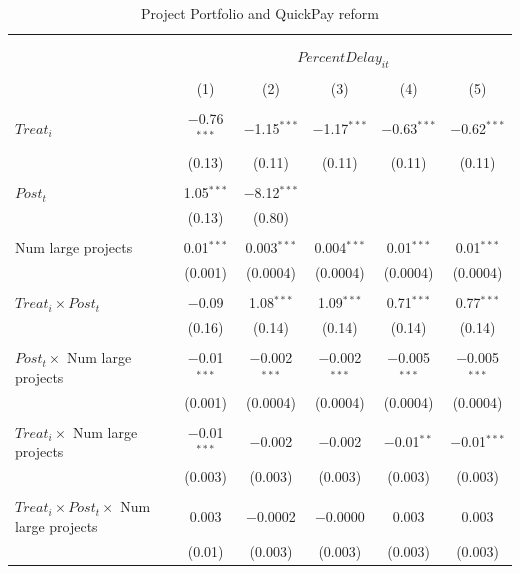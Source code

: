 \documentclass[
]{article}
\begin{document}
\begin{table}[H] \centering 
  \caption{Project Portfolio and QuickPay reform} 
  \label{} 
\small 
\begin{tabular}{@{\extracolsep{-2pt}}lccccc} 
\\[-1.8ex]\hline 
\hline \\[-1.8ex] 
\\[-1.8ex] & \multicolumn{5}{c}{$PercentDelay_{it}$  } \\ 
\\[-1.8ex] & (1) & (2) & (3) & (4) & (5)\\ 
\hline \\[-1.8ex] 
 $Treat_i$ & $-$0.76$^{***}$ & $-$1.15$^{***}$ & $-$1.17$^{***}$ & $-$0.63$^{***}$ & $-$0.62$^{***}$ \\ 
  & (0.13) & (0.11) & (0.11) & (0.11) & (0.11) \\ 
  & & & & & \\ 
 $Post_t$ & 1.05$^{***}$ & $-$8.12$^{***}$ &  &  &  \\ 
  & (0.13) & (0.80) &  &  &  \\ 
  & & & & & \\ 
 Num large projects & 0.01$^{***}$ & 0.003$^{***}$ & 0.004$^{***}$ & 0.01$^{***}$ & 0.01$^{***}$ \\ 
  & (0.001) & (0.0004) & (0.0004) & (0.0004) & (0.0004) \\ 
  & & & & & \\ 
 $Treat_i \times Post_t$ & $-$0.09 & 1.08$^{***}$ & 1.09$^{***}$ & 0.71$^{***}$ & 0.77$^{***}$ \\ 
  & (0.16) & (0.14) & (0.14) & (0.14) & (0.14) \\ 
  & & & & & \\ 
 $Post_t \times$ Num large projects & $-$0.01$^{***}$ & $-$0.002$^{***}$ & $-$0.002$^{***}$ & $-$0.005$^{***}$ & $-$0.005$^{***}$ \\ 
  & (0.001) & (0.0004) & (0.0004) & (0.0004) & (0.0004) \\ 
  & & & & & \\ 
 $Treat_i \times$ Num large projects & $-$0.01$^{***}$ & $-$0.002 & $-$0.002 & $-$0.01$^{**}$ & $-$0.01$^{***}$ \\ 
  & (0.003) & (0.003) & (0.003) & (0.003) & (0.003) \\ 
  & & & & & \\ 
 $Treat_i \times Post_t \times$ Num large projects & 0.003 & $-$0.0002 & $-$0.0000 & 0.003 & 0.003 \\ 
  & (0.01) & (0.003) & (0.003) & (0.003) & (0.003) \\ 

\end{tabular}
\end{table}
\end{document}
